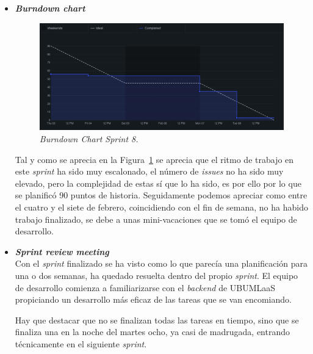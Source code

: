 \begin{itemize}
\item \textbf{\textit{Burndown chart}}\\
\begin{figure}
\begin{center}
\includegraphics[width=\textwidth]{../img/anexos/sprints/BD-Sprint8}
\caption{\textit{Burndown Chart Sprint 8.}}\label{fig:BD-Sprint8}
\end{center}
\end{figure}
Tal y como se aprecia en la Figura~\ref{fig:BD-Sprint8} se aprecia que el ritmo de trabajo en este \textit{sprint} ha sido muy escalonado, el número de \textit{issues} no ha sido muy elevado, pero la complejidad de estas sí que lo ha sido, es por ello por lo que se planificó 90 puntos de historia. Seguidamente podemos apreciar como entre el cuatro y el siete de febrero, coincidiendo con el fin de semana, no ha habido trabajo finalizado, se debe a unas mini-vacaciones que se tomó el equipo de desarrollo.

\item \textbf{\textit{Sprint review meeting}}\\
Con el \textit{sprint} finalizado se ha visto como lo que parecía una planificación para una o dos semanas, ha quedado resuelta dentro del propio \textit{sprint}. El equipo de desarrollo comienza a familiarizarse con el \textit{backend} de UBUMLaaS propiciando un desarrollo más eficaz de las tareas que se van encomiando.

Hay que destacar que no se finalizan todas las tareas en tiempo, sino que se finaliza una en la noche del martes ocho, ya casi de madrugada, entrando técnicamente en el siguiente \textit{sprint}.

\end{itemize}

